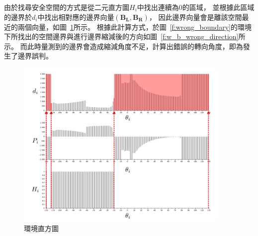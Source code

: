 由於找尋安全空間的方式是從二元直方圖$H_i$中找出連續為$0$的區域，
並根據此區域的邊界於$d_i$中找出相對應的邊界向量$(\mathbf{B_L},\mathbf{B_R})$，
因此邊界向量會是離該空間最近的兩個向量，如圖~\ref{f:closest_histograms}所示。
根據此計算方式，於圖~\ref{f:wrong_boundary}的環境下所找出的空間邊界與進行邊界縮減後的方向如圖~\ref{f:w_b_wrong_direction}所示。
而此時量測到的邊界會造成縮減角度不足，計算出錯誤的轉向角度，即為發生了邊界誤判。
\begin{figure}[h!]
	\centering
	\includegraphics[width=0.92\textwidth]{figures/algorithm/closest_histograms}
	\caption{環境直方圖}
	\label{f:closest_histograms}
\end{figure}

